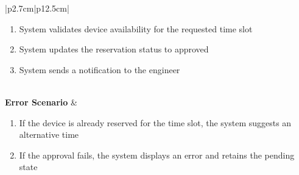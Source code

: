 \begin{table}[H]
\begin{tabular}{|p{2.7cm}|p{12.5cm}|}
\begin{minipage}[t]{\linewidth}
\begin{enumerate}[topsep=0pt,itemsep=1pt,parsep=0pt,partopsep=0pt]
                                          \item System validates device availability for the requested time slot
                                          \item System updates the reservation status to approved
                                          \item System sends a notification to the engineer
                                      \end{enumerate}
                                  \end{minipage}           \\
        \hline
        \textbf{Error Scenario} & \begin{minipage}[t]{\linewidth}
                                      \begin{enumerate}[topsep=0pt,itemsep=1pt,parsep=0pt,partopsep=0pt]
                                          \item If the device is already reserved for the time slot, the system suggests an
                                                alternative time
                                          \item If the approval fails, the system displays an error and retains the pending
                                                state
                                      \end{enumerate}
                                  \end{minipage} \\
        \hline
    \end{tabular}
    \label{tab:admin-approve-usb-reservation}
\end{table}
